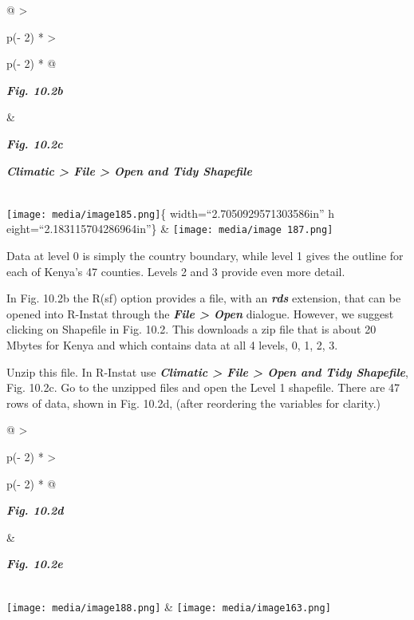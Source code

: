 \documentclass[
  letterpaper,
  DIV=11,
  numbers=noendperiod]{scrreprt}
\begin{document}
\begin{longtable}[]{@{}
  >{\raggedright\arraybackslash}p{(\columnwidth - 2\tabcolsep) * }
  >{\raggedright\arraybackslash}p{(\columnwidth - 2\tabcolsep) * }@{}}
\toprule\noalign{}
\begin{minipage}[b]{\linewidth}\raggedright
\textbf{\emph{Fig. 10.2b}}
\end{minipage} & \begin{minipage}[b]{\linewidth}\raggedright
\textbf{\emph{Fig. 10.2c}}

\textbf{\emph{Climatic \textgreater{} File \textgreater{} Open and Tidy
Shapefile}}
\end{minipage} \\
\midrule\noalign{}
\endhead
\bottomrule\noalign{}
\endlastfoot
\texttt{[image: media/image185.png]}\{ width=``2.7050929571303586in'' h
eight=``2.183115704286964in''\} &
\texttt{[image: media/image 187.png]} \\
\end{longtable}

Data at level 0 is simply the country boundary, while level 1 gives the
outline for each of Kenya's 47 counties. Levels 2 and 3 provide even
more detail.

In Fig. 10.2b the R(sf) option provides a file, with an
\textbf{\emph{rds}} extension, that can be opened into R-Instat through
the \textbf{\emph{File \textgreater{} Open}} dialogue. However, we
suggest clicking on Shapefile in Fig. 10.2. This downloads a zip file
that is about 20 Mbytes for Kenya and which contains data at all 4
levels, 0, 1, 2, 3.

Unzip this file. In R-Instat use \textbf{\emph{Climatic \textgreater{}
File \textgreater{} Open and Tidy Shapefile}}, Fig. 10.2c. Go to the
unzipped files and open the Level 1 shapefile. There are 47 rows of
data, shown in Fig. 10.2d, (after reordering the variables for clarity.)

\begin{longtable}[]{@{}
  >{\raggedright\arraybackslash}p{(\columnwidth - 2\tabcolsep) * }
  >{\raggedright\arraybackslash}p{(\columnwidth - 2\tabcolsep) * }@{}}
\toprule\noalign{}
\begin{minipage}[b]{\linewidth}\raggedright
\textbf{\emph{Fig. 10.2d}}
\end{minipage} & \begin{minipage}[b]{\linewidth}\raggedright
\textbf{\emph{Fig. 10.2e}}
\end{minipage} \\
\midrule\noalign{}
\endhead
\bottomrule\noalign{}
\endlastfoot
\texttt{[image: media/image188.png]} &
\texttt{[image: media/image163.png]} \\
\end{longtable}
\end{document}
